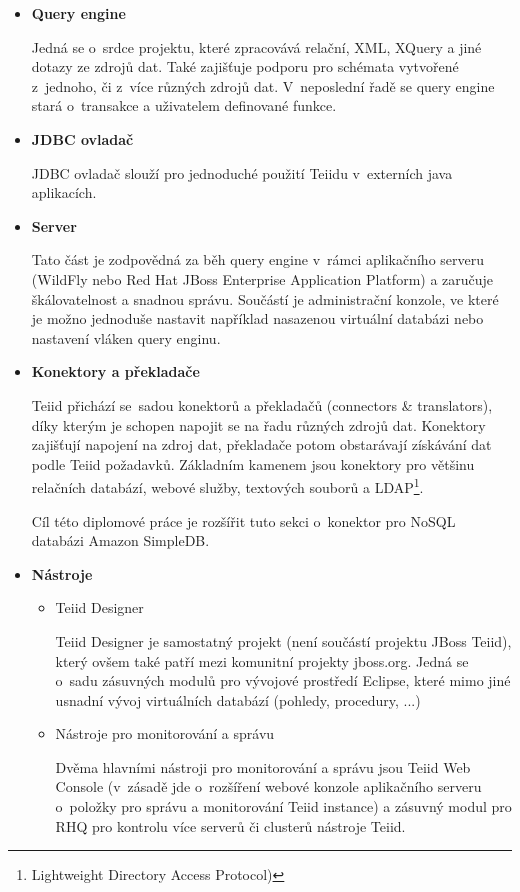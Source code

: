\documentclass[oneside,12pt]{fithesis2}
\begin{document}
\begin{itemize}
 \item \textbf{Query engine}
 
 Jedná se o~srdce projektu, které zpracovává relační, XML, XQuery a jiné dotazy ze zdrojů dat. Také zajišťuje podporu pro schémata vytvořené z~jednoho, či z~více různých zdrojů dat. V~neposlední řadě se query engine stará o~transakce a uživatelem definované funkce.
 
 \item \textbf{JDBC ovladač}
 
 JDBC ovladač slouží pro jednoduché použití Teiidu v~externích java aplikacích.
 
 \item \textbf{Server}
 
 Tato část je zodpovědná za běh query engine v~rámci aplikačního serveru (WildFly nebo Red Hat JBoss Enterprise Application Platform) a zaručuje škálovatelnost a snadnou správu. Součástí je administrační konzole, ve které je možno jednoduše nastavit například nasazenou virtuální databázi nebo nastavení vláken query enginu.

 \item \textbf{Konektory a překladače}

 Teiid přichází se~sadou konektorů a překladačů (connectors \& translators), díky kterým je schopen napojit se na řadu různých zdrojů dat. Konektory zajišťují napojení na zdroj dat, překladače potom obstarávají získávání dat podle Teiid požadavků. Základním kamenem jsou konektory pro většinu relačních databází, webové služby, textových souborů a LDAP\footnote{Lightweight Directory Access Protocol)}.
 
 Cíl této diplomové práce je rozšířit tuto sekci o~konektor pro NoSQL databázi Amazon SimpleDB.
 
 \item \textbf{Nástroje}
 
  \begin{itemize}
  \item Teiid Designer
  
  Teiid Designer je samostatný projekt (není součástí projektu JBoss Teiid), který ovšem také patří mezi komunitní projekty jboss.org. Jedná se o~sadu zásuvných modulů pro vývojové prostředí Eclipse, které mimo jiné usnadní vývoj virtuálních databází (pohledy, procedury, ...)
  
  \item Nástroje pro monitorování a správu
  
  Dvěma hlavními nástroji pro monitorování a správu jsou Teiid Web Console (v~zásadě jde o~rozšíření webové konzole aplikačního serveru o~položky pro správu a monitorování Teiid instance) a zásuvný modul pro RHQ pro kontrolu více serverů či clusterů nástroje Teiid.
  

\end{itemize}
\end{itemize}
\end{document}
